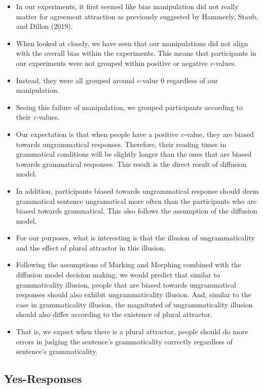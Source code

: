 \documentclass[
  10pt,
  english,
  doc,floatsintext]{apa6}
\providecommand{\tightlist}{%
  \setlength{\itemsep}{0pt}\setlength{\parskip}{0pt}}
\begin{document}
\begin{itemize}
\tightlist
\item
  In our experiments, it first seemed like bias manipulation did not really matter for agreement attraction as previously suggested by Hammerly, Staub, and Dillon (2019).
\item
  When looked at closely, we have seen that our manipulations did not align with the overall bias within the experiments. This means that participants in our experiments were not grouped within positive or negative \emph{c}-values.
\item
  Instead, they were all grouped around \emph{c}-value \(0\) regardless of our manipulation.
\item
  Seeing this failure of manipulation, we grouped participants according to their \emph{c}-values.
\item
  Our expectation is that when people have a positive \emph{c}-value, they are biased towards ungrammatical responses. Therefore, their reading times in grammatical conditions will be slightly longer than the ones that are biased towards grammatical responses. This result is the direct result of diffusion model.
\item
  In addition, participants biased towards ungrammatical response should deem grammatical sentence ungramatical more often than the participants who are biased towards grammatical. This also follows the assumption of the diffusion model.
\item
  For our purposes, what is interesting is that the illusion of ungrammaticality and the effect of plural attractor in this illusion.
\item
  Following the assumptions of Marking and Morphing combined with the diffusion model decision making, we would predict that similar to grammaticality illusion, people that are biased towards ungrammatical responses should also exhibit ungrammaticality illusion. And, similar to the case in grammaticality illusion, the magnituted of ungrammaticality illusion should also differ according to the existence of plural attractor.
\item
  That is, we expect when there is a plural attractor, people should do more errors in judging the sentence's grammaticality correctly regardless of sentence's grammaticality.
\end{itemize}

\hypertarget{yes-responses-2}{%
\subsection{Yes-Responses}\label{yes-responses-2}}
\end{document}
